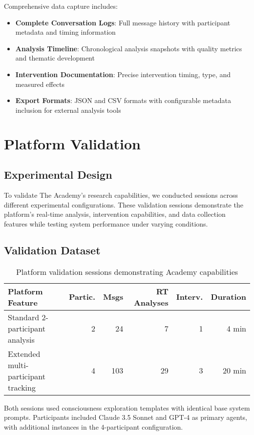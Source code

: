 \documentclass[11pt,letterpaper]{article}
\newcommand{\theacademy}{The Academy}
\begin{document}
Comprehensive data capture includes:

\begin{itemize}
    \item \textbf{Complete Conversation Logs}: Full message history with participant metadata and timing information
    \item \textbf{Analysis Timeline}: Chronological analysis snapshots with quality metrics and thematic development
    \item \textbf{Intervention Documentation}: Precise intervention timing, type, and measured effects
    \item \textbf{Export Formats}: JSON and CSV formats with configurable metadata inclusion for external analysis tools
\end{itemize}

\section{Platform Validation}

\subsection{Experimental Design}

To validate \theacademy{}'s research capabilities, we conducted sessions across different experimental configurations. These validation sessions demonstrate the platform's real-time analysis, intervention capabilities, and data collection features while testing system performance under varying conditions.

\subsection{Validation Dataset}

\begin{table}[h]
\centering
\begin{tabular}{lrrrrr}
\toprule
\textbf{Platform Feature} & \textbf{Partic.} & \textbf{Msgs} & \textbf{RT Analyses} & \textbf{Interv.} & \textbf{Duration} \\
\midrule
Standard 2-participant analysis & 2 & 24 & 7 & 1 & 4 min \\
Extended multi-participant tracking & 4 & 103 & 29 & 3 & 20 min \\
\bottomrule
\end{tabular}
\caption{Platform validation sessions demonstrating Academy capabilities}
\label{tab:platform_validation}
\end{table}
Both sessions used consciousness exploration templates with identical base system prompts. Participants included Claude 3.5 Sonnet and GPT-4 as primary agents, with additional instances in the 4-participant configuration.
\end{document}
